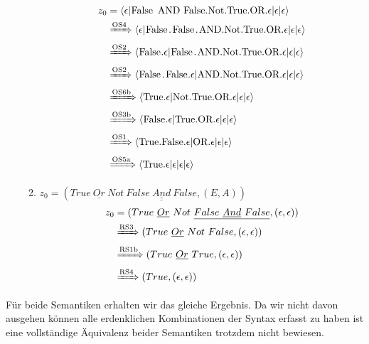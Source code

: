 \documentclass[ngerman,a4paper]{report}
\begin{document}
\begin{enumerate}
\begin{enumerate}
\begin{align*}
z_0&=\langle \epsilon|\text{\lstinline!False AND False.Not.True.OR!}.\epsilon|\epsilon|\epsilon\rangle \\
&\xRightarrow{\text{OS4}} \langle \epsilon|\text{\lstinline!False.False.AND.Not.True.OR!}.\epsilon|\epsilon|\epsilon\rangle\\
&\xRightarrow{\text{OS2}} \langle \text{\lstinline!False!}.\epsilon|\text{\lstinline!False.AND.Not.True.OR!}.\epsilon|\epsilon|\epsilon\rangle\\
&\xRightarrow{\text{OS2}} \langle \text{\lstinline!False.False!}.\epsilon|\text{\lstinline!AND.Not.True.OR!}.\epsilon|\epsilon|\epsilon\rangle\\
&\xRightarrow{\text{OS6b}} \langle \text{\lstinline!True!}.\epsilon|\text{\lstinline!Not.True.OR!}.\epsilon|\epsilon|\epsilon\rangle\\
&\xRightarrow{\text{OS3b}} \langle \text{\lstinline!False!}.\epsilon|\text{\lstinline!True.OR!}.\epsilon|\epsilon|\epsilon\rangle\\
&\xRightarrow{\text{OS1}} \langle \text{\lstinline!True.False!}.\epsilon|\text{\lstinline!OR!}.\epsilon|\epsilon|\epsilon\rangle\\
&\xRightarrow{\text{OS5a}} \langle \text{\lstinline!True!}.\epsilon|\epsilon|\epsilon|\epsilon\rangle\\
\end{align*}
\item $z_0=(True\ \underline{Or}\ Not\ \underline{False\ \underline{And}\ False}, (E,A))$\\
\begin{align*}
z_0&=(True\ \underline{Or}\ Not\ \underline{False\ \underline{And}\ False}, (\epsilon,\epsilon))\\
&\xRightarrow{\text{RS3}} (True\ \underline{Or}\ Not\ False, (\epsilon,\epsilon))\\
&\xRightarrow{\text{RS1b}} (True\ \underline{Or}\ True, (\epsilon,\epsilon))\\
&\xRightarrow{\text{RS4}} (True,(\epsilon,\epsilon))
\end{align*}
\end{enumerate}
\end{enumerate}
Für beide Semantiken erhalten wir das gleiche Ergebnis. Da wir nicht davon ausgehen können alle erdenklichen Kombinationen der Syntax erfasst zu haben ist eine vollständige Äquivalenz beider Semantiken trotzdem nicht bewiesen.\\
\end{document}
